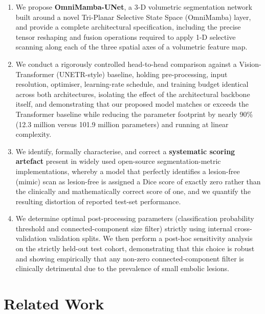 \documentclass[pdflatex,sn-mathphys-num]{sn-jnl}
\begin{document}
\begin{enumerate}
\item We propose \textbf{OmniMamba-UNet}, a 3-D volumetric
      segmentation network built around a novel Tri-Planar Selective
      State Space (OmniMamba) layer, and provide a complete
      architectural specification, including the precise tensor
      reshaping and fusion operations required to apply 1-D selective
      scanning along each of the three spatial axes of a volumetric
      feature map.
\item We conduct a rigorously controlled head-to-head comparison
      against a Vision-Transformer (UNETR-style) baseline, holding
      pre-processing, input resolution, optimiser, learning-rate
      schedule, and training budget identical across both
      architectures, isolating the effect of the architectural
      backbone itself, and demonstrating that our proposed model matches
      or exceeds the Transformer baseline while reducing the parameter
      footprint by nearly 90\% (12.3 million versus 101.9 million parameters)
      and running at linear complexity.
\item We identify, formally characterise, and correct a
      \textbf{systematic scoring artefact} present in widely used
      open-source segmentation-metric implementations, whereby a
      model that perfectly identifies a lesion-free (mimic) scan as
      lesion-free is assigned a Dice score of exactly zero rather than
      the clinically and mathematically correct score of one,
      and we quantify the resulting distortion of reported test-set
      performance.
\item We determine optimal post-processing parameters (classification probability threshold and connected-component size filter) strictly using internal cross-validation validation splits. We then perform a post-hoc sensitivity analysis on the strictly held-out test cohort, demonstrating that this choice is robust and showing empirically that any non-zero connected-component filter is clinically detrimental due to the prevalence of small embolic lesions.
\end{enumerate}

\section{Related Work}\label{sec:related}
\end{document}
